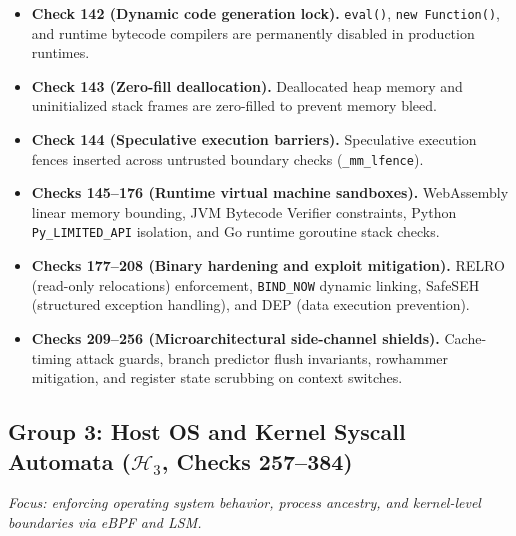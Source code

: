 \documentclass{portalciencia}
\theoremstyle{plain}
\theoremstyle{definition}
\begin{document}
\begin{itemize}
  \item \textbf{Check 142 (Dynamic code generation lock).} \texttt{eval()}, \texttt{new Function()}, and runtime bytecode compilers are permanently disabled in production runtimes.
  \item \textbf{Check 143 (Zero-fill deallocation).} Deallocated heap memory and uninitialized stack frames are zero-filled to prevent memory bleed.
  \item \textbf{Check 144 (Speculative execution barriers).} Speculative execution fences inserted across untrusted boundary checks (\texttt{\_mm\_lfence}).
  \item \textbf{Checks 145--176 (Runtime virtual machine sandboxes).} WebAssembly linear memory bounding, JVM Bytecode Verifier constraints, Python \texttt{Py\_LIMITED\_API} isolation, and Go runtime goroutine stack checks.
  \item \textbf{Checks 177--208 (Binary hardening and exploit mitigation).} RELRO (read-only relocations) enforcement, \texttt{BIND\_NOW} dynamic linking, SafeSEH (structured exception handling), and DEP (data execution prevention).
  \item \textbf{Checks 209--256 (Microarchitectural side-channel shields).} Cache-timing attack guards, branch predictor flush invariants, rowhammer mitigation, and register state scrubbing on context switches.
\end{itemize}

\subsection{Group 3: Host OS and Kernel Syscall Automata ($\mathcal{H}_3$, Checks 257--384)}

\emph{Focus: enforcing operating system behavior, process ancestry, and kernel-level boundaries via eBPF and LSM.}
\end{document}
